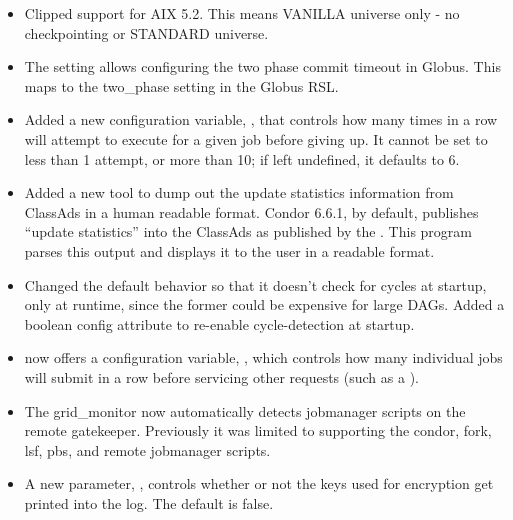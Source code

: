 \begin{itemize}

\item Clipped support for AIX 5.2.
      This means VANILLA universe only - no checkpointing or STANDARD universe.

\item The setting  allows
   configuring the two phase commit timeout in Globus.  This maps to the
   two\_phase setting in the Globus RSL.

\item Added a new configuration variable,
      , that controls how many
      times in a row  will attempt to execute
       for a given job before giving up.  It cannot be
      set to less than 1 attempt, or more than 10; if left undefined,
      it defaults to 6.

\item Added a new tool  to dump out the update
statistics information from ClassAds in a human readable format.
Condor 6.6.1, by default, publishes ``update statistics'' into the
ClassAds as published by the .  This program parses
this output and displays it to the user in a readable format.

\item Changed the default  behavior so that it doesn't
      check for cycles at startup, only at runtime, since the former
      could be expensive for large DAGs.  Added a boolean
       config attribute to
      re-enable cycle-detection at startup.

\item {} now offers a configuration variable,
      , which controls how
      many individual jobs  will submit in a row before
      servicing other requests (such as a ).

\item The grid\_monitor now automatically detects jobmanager scripts on the
      remote gatekeeper.  Previously it was limited to supporting the condor,
	  fork, lsf, pbs, and remote jobmanager scripts.

\item A new parameter, , controls whether or not
      the keys used for encryption get printed into the log.
	  The default is false.


\end{itemize}


